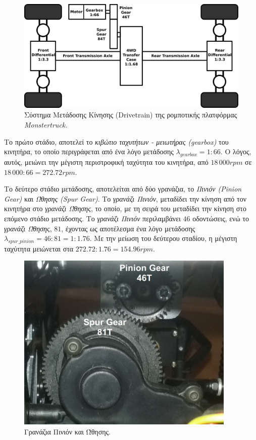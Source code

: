 \bigskip
\begin{figure}[!ht]
	\centering
	\includegraphics[width=0.8\linewidth]{Chapters/Chapter2/Figures/drivetrain.png}
	\caption{Σύστημα Μετάδοσης Κίνησης (Drivetrain) της ρομποτικής πλατφόρμας \textit{Monstertruck.}}
	\label{fig:drivetrain}
\end{figure}

\bigskip
Το πρώτο στάδιο, αποτελεί το \textit{κιβώτιο ταχυτήτων - μειωτήρας (gearbox)} του κινητήρα, το οποίο περιγράφεται από ένα λόγο μετάδοσης $\lambda_{gearbox}=1:66$. Ο λόγος, αυτός, μειώνει την μέγιστη περιστροφική ταχύτητα του κινητήρα, από $18\,000rpm$ σε $18\,000:66=272.72rpm$.

\bigskip
Το δεύτερο στάδιο μετάδοσης, αποτελείται από δύο γρανάζια, το \textit{Πινιόν (Pinion Gear)} και \textit{Ώθησης (Spur Gear)}. Το \textit{γρανάζι Πινιόν}, μεταδίδει την κίνηση από τον κινητήρα στο \textit{γρανάζι Ώθησης}, το οποίο, με τη σειρά του μεταδίδει την κίνηση στο επόμενο στάδιο μετάδοσης. Το \textit{γρανάζι Πινιόν} περιλαμβάνει $46$ οδοντώσεις, ενώ το \textit{γρανάζι Ώθησης}, $81$, έχοντας ως αποτέλεσμα ένα λόγο μετάδοσης $\lambda_{spur\_pinion}=46:81=1:1.76$. Με την μείωση του δεύτερου σταδίου, η μέγιστη ταχύτητα μειώνεται στα $272.72:1.76 = 154.96rpm$.

\begin{figure}[!ht]
	\centering
	\includegraphics[width=0.4\linewidth]{Chapters/Chapter2/Figures/spur_and_pinion_gears.png}
	\caption{Γρανάζια Πινιόν και Ώθησης.}
	\label{fig:spur_pinion_gears}
\end{figure}

